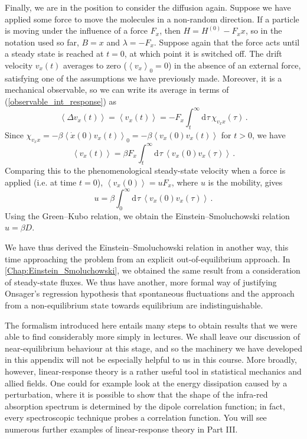 \documentclass{article}
\theoremstyle{plain}\theoremheaderfont{\normalfont\bfseries}\theorembodyfont{\rmfamily}\theoremseparator{.}\newtheorem*{thm}{Theorem}\newtheorem*{law}{Law}\newtheorem*{pos}{Postulate}
\numberwithin{equation}{section}
\newcommand{\dd}[2][]{\mathrm{d}^{#1} #2\,}
\newcommand{\eval}[1]{\left\langle #1 \right\rangle}
\begin{document}
    Finally, we are in the position to consider the diffusion again. Suppose we have applied some force to move the molecules in a non-random direction. If a particle is moving under the influence of a force \(F_x\), then \(H=H^{(0)}-F_x x\), so in the notation used so far, \(B=x\) and \(\lambda=-F_x\). Suppose again that the force acts until a steady state is reached at \(t=0\), at which point it is switched off. The drift velocity \(v_x(t)\) averages to zero (\(\eval{v_x}_0=0\)) in the absence of an external force, satisfying one of the assumptions we have previously made. Moreover, it is a mechanical observable, so we can write its average in terms of (\ref{observable_int_response}) as
    \begin{equation}
        \eval{\Delta v_x(t)}=\eval{v_x(t)}=-F_x\int_{t}^{\infty}\dd{\tau}\chi_{v_x x}(\tau)\,.
    \end{equation}
    Since \(\chi_{v_x x}=-\beta\eval{\dot{x}(0)v_x(t)}_0=-\beta\eval{v_x(0)v_x(t)}\) for \(t>0\), we have
    \begin{equation}
        \eval{v_x(t)}=\beta F_x\int_{t}^{\infty}\dd{\tau}\eval{v_x(0)v_x(\tau)}\,.
    \end{equation}
    Comparing this to the phenomenological steady-state velocity when a force is applied (i.e. at time \(t=0\)), \(\eval{v_x(0)}=uF_x\), where \(u\) is the mobility, gives
    \begin{equation}
        u=\beta\int_{0}^{\infty}\dd{\tau}\eval{v_x(0)v_x(\tau)}\,.
    \end{equation}
    Using the Green--Kubo relation, we obtain the Einstein--Smoluchowski relation \(u=\beta D\).

    We have thus derived the Einstein--Smoluchowski relation in another way, this time approaching the problem from an explicit out-of-equilibrium approach. In \cref{Chap:Einstein_Smoluchowski}, we obtained the same result from a consideration of steady-state fluxes. We thus have another, more formal way of justifying Onsager's regression hypothesis that spontaneous fluctuations and the approach from a non-equilibrium state towards equilibrium are indistinguishable.

    The formalism introduced here entails many steps to obtain results that we were able to find considerably more simply in lectures. We shall leave our discussion of near-equilibrium behaviour at this stage, and so the machinery we have developed in this appendix will not be especially helpful to us in this course. More broadly, however, linear-response theory is a rather useful tool in statistical mechanics and allied fields. One could for example look at the energy dissipation caused by a perturbation, where it is possible to show that the shape of the infra-red absorption spectrum is determined by the dipole correlation function; in fact, every spectroscopic technique probes a correlation function. You will see numerous further examples of linear-response theory in Part III.
\end{document}
